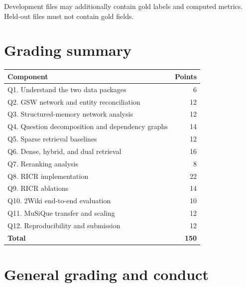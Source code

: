 \documentclass[11pt]{article}
\newcommand{\RICR}{{\mdseries\textsc{RICR}}\xspace}
\begin{document}
Development files may additionally contain gold labels and computed metrics.
Held-out files must not contain gold fields.

\section{Grading summary}

\begin{center}
\begin{tabularx}{0.96\textwidth}{@{}Y r@{}}
\toprule
\textbf{Component} & \textbf{Points}\\
\midrule
Q1. Understand the two data packages & 6\\
Q2. GSW network and entity reconciliation & 12\\
Q3. Structured-memory network analysis & 12\\
Q4. Question decomposition and dependency graphs & 14\\
Q5. Sparse retrieval baselines & 12\\
Q6. Dense, hybrid, and dual retrieval & 16\\
Q7. Reranking analysis & 8\\
Q8. \RICR implementation & 22\\
Q9. \RICR ablations & 14\\
Q10. 2Wiki end-to-end evaluation & 10\\
Q11. MuSiQue transfer and scaling & 12\\
Q12. Reproducibility and submission & 12\\
\midrule
\textbf{Total} & \textbf{150}\\
\bottomrule
\end{tabularx}
\end{center}

\section{General grading and conduct}
\end{document}

